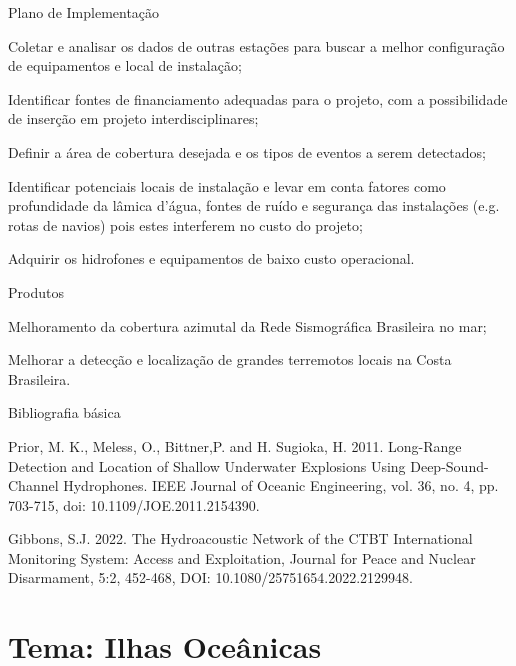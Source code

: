\documentclass[10pt,a4paper,oneside]{book}
\begin{document}
\begin{fancyenum}{\faBrain}{Plano de Implementação}
	\item Coletar e analisar os dados de outras estações para buscar a melhor configuração de equipamentos e local de instalação;
	\item Identificar fontes de financiamento adequadas para o projeto, com a possibilidade de inserção em projeto interdisciplinares;
	\item Definir a área de cobertura desejada e os tipos de eventos a serem detectados;
	\item Identificar potenciais locais de instalação e levar em conta fatores como profundidade da lâmica d'água, fontes de ruído e segurança das instalações (e.g. rotas de navios) pois estes interferem no custo do projeto;
	\item Adquirir os hidrofones e equipamentos de baixo custo operacional.
\end{fancyenum}

\begin{fancyenum}{\faShoppingCart}{Produtos}
	\item Melhoramento da cobertura azimutal da Rede Sismográfica Brasileira no mar;
	\item Melhorar a detecção e localização de grandes terremotos locais na Costa Brasileira.
\end{fancyenum}

\begin{fancyenum}{\faBook}{Bibliografia básica}
	\item Prior, M. K., Meless, O., Bittner,P. and H. Sugioka, H. 2011. Long-Range Detection and Location of Shallow Underwater Explosions Using Deep-Sound-Channel Hydrophones. IEEE Journal of Oceanic Engineering, vol. 36, no. 4, pp. 703-715, doi: 10.1109/JOE.2011.2154390.
	\item Gibbons, S.J. 2022. The Hydroacoustic Network of the CTBT International Monitoring System: Access and Exploitation, Journal for Peace and Nuclear Disarmament, 5:2, 452-468, DOI: 10.1080/25751654.2022.2129948.
\end{fancyenum}


\section{Tema: Ilhas Oceânicas}
\end{document}
